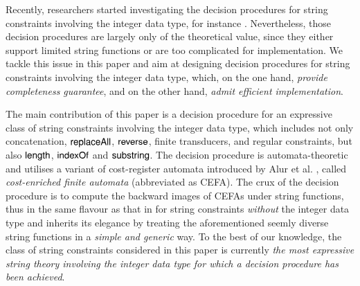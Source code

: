 
Recently, researchers started investigating the decision procedures for string constraints involving the integer data type, for instance \cite{Vijay-length,LeH18,LinM18,LB16}. Nevertheless, those decision procedures are largely only of the theoretical value, since they either support limited string functions or are too complicated for  implementation. 
We tackle this issue in this paper and aim at designing decision procedures for string constraints involving the integer data type, which, on the one hand, \emph{provide completeness guarantee}, and on the other hand, \emph{admit efficient implementation}.

The main contribution of this paper is a decision procedure for an expressive class of string constraints involving the integer data type, which includes not only concatenation, $\mathsf{replaceAll}$, $\mathsf{reverse}$, finite transducers, and regular constraints, but also $\mathsf{length}$, $\mathsf{indexOf}$ and $\mathsf{substring}$. The decision procedure is automata-theoretic and utilises a variant of cost-register automata introduced by Alur et al. \cite{RLJ+13}, called \emph{cost-enriched finite automata} (abbreviated as CEFA). The crux of the decision procedure is to compute the backward images of CEFAs under string functions, thus in the same flavour as that in \cite{CHL+19} for string constraints \emph{without} the integer data type and inherits its elegance by treating the aforementioned seemly diverse string functions in a \emph{simple and generic} way. To the best of our knowledge, the class of string constraints considered in this paper is currently \emph{the most expressive string theory involving the integer data type for which a decision procedure has been achieved}. 

